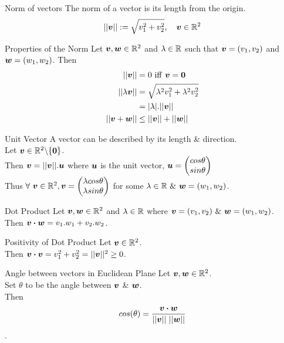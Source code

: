 \documentclass[11pt,a4paper]{article}
\begin{document}
\subtitle{Definition 1.04 - }{Norm of vectors}
The norm of a vector is its length from the origin. \\
$$||\boldsymbol{v}|| := \sqrt{v_{1}^{2} + v_{2}^{2}}, \quad \boldsymbol{v} \in \mathbb{R}^2$$

\subtitle{Theorem 1.05 - }{Properties of the Norm}
Let $\boldsymbol{v}, \boldsymbol{w} \in \mathbb{R}^2$ and $\lambda \in \mathbb{R} $ such that $\boldsymbol{v} = (v_1,v_2)$ and $\boldsymbol{w} = (w_1,w_2)$. Then
\begin{align*}
  ||\boldsymbol{v}|| &= 0\ \mathrm{iff}\ \boldsymbol{v} = \boldsymbol{0}\\
  ||\lambda\boldsymbol{v}|| &= \sqrt{\lambda^2v_{1}^{2} + \lambda^2v_{2}^{2}} \\
  &= |\lambda|.||\boldsymbol{v}|| \\
  ||\boldsymbol{v} + \boldsymbol{w}|| &\leq ||\boldsymbol{v}|| + ||\boldsymbol{w}||
\end{align*}

\subtitle{Definition 1.06 - }{Unit Vector}
A vector can be described by its length \& direction. \\
Let $\boldsymbol{v} \in \mathbb{R}^2\backslash\{\boldsymbol{0}\}$. \\
Then $\boldsymbol{v} = ||\boldsymbol{v}||.\boldsymbol{u}$ where $\boldsymbol{u}$ is the unit vector, $\boldsymbol{u} = \begin{pmatrix} cos\theta \\ sin\theta \end{pmatrix}$ \\
Thus $\forall\ \boldsymbol{v} \in \mathbb{R}^2, \boldsymbol{v} = \begin{pmatrix} \lambda cos\theta \\ \lambda sin\theta \end{pmatrix}$ for some $\lambda \in \mathbb{R}\ \&\ \boldsymbol{w} = (w_1, w_2)$. \\

\subtitle{Definition 1.07 - }{Dot Product}
Let $\boldsymbol{v}, \boldsymbol{w} \in \mathbb{R}^2$ and $\lambda \in \mathbb{R}$ where $\vect{v} = (v_1,v_2)\ \&\ \vect{w} = (w_1, w_2)$. \\
Then $\boldsymbol{v} \boldsymbol{\cdot} \boldsymbol{w} = v_1.w_1 + v_2.w_2$. \\

\subtitle{Remark 1.08 - }{Positivity of Dot Product}
Let $\boldsymbol{v} \in \mathbb{R}^2$. \\
Then $\boldsymbol{v} \boldsymbol{\cdot} \boldsymbol{v} = v_{1}^{2} + v_{2}^{2} = ||\boldsymbol{v}||^2 \geq 0$. \\

\subtitle{Remark 1.09 - }{Angle between vectors in Euclidean Plane}
Let $\boldsymbol{v}, \boldsymbol{w} \in \mathbb{R}^2$. \\
Set $\theta$ to be the angle between $\boldsymbol{v}$ \& $\boldsymbol{w}$. \\
Then
$$cos(\theta) = \frac{\boldsymbol{v} \boldsymbol{\cdot} \boldsymbol{w}}{||\boldsymbol{v}||\ ||\boldsymbol{w}||}$$.
\end{document}
